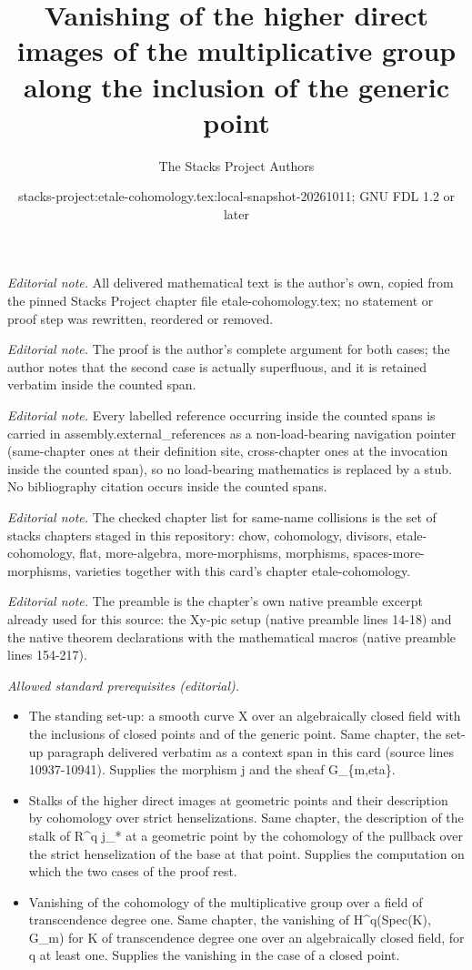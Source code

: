\documentclass[10pt,a4paper]{amsart}
\title{Vanishing of the higher direct images of the multiplicative group along the inclusion of the generic point}
\author{The Stacks Project Authors}
\date{stacks-project:etale-cohomology.tex:local-snapshot-20261011; GNU FDL 1.2 or later}
\theoremstyle{plain}
\theoremstyle{definition}
\theoremstyle{remark}
\numberwithin{equation}{subsection}
\begin{document}
\maketitle
\noindent\textit{Editorial note.} All delivered mathematical text is the author's own, copied from the pinned Stacks Project chapter file etale-cohomology.tex; no statement or proof step was rewritten, reordered or removed.\par\medskip
\noindent\textit{Editorial note.} The proof is the author's complete argument for both cases; the author notes that the second case is actually superfluous, and it is retained verbatim inside the counted span.\par\medskip
\noindent\textit{Editorial note.} Every labelled reference occurring inside the counted spans is carried in assembly.external\_references as a non-load-bearing navigation pointer (same-chapter ones at their definition site, cross-chapter ones at the invocation inside the counted span), so no load-bearing mathematics is replaced by a stub. No bibliography citation occurs inside the counted spans.\par\medskip
\noindent\textit{Editorial note.} The checked chapter list for same-name collisions is the set of stacks chapters staged in this repository: chow, cohomology, divisors, etale-cohomology, flat, more-algebra, more-morphisms, morphisms, spaces-more-morphisms, varieties together with this card's chapter etale-cohomology.\par\medskip
\noindent\textit{Editorial note.} The preamble is the chapter's own native preamble excerpt already used for this source: the Xy-pic setup (native preamble lines 14-18) and the native theorem declarations with the mathematical macros (native preamble lines 154-217).\par\medskip
\noindent\textit{Allowed standard prerequisites (editorial).}\begin{itemize}
\item The standing set-up: a smooth curve X over an algebraically closed field with the inclusions of closed points and of the generic point. Same chapter, the set-up paragraph delivered verbatim as a context span in this card (source lines 10937-10941). Supplies the morphism j and the sheaf G\_\{m,eta\}.
\item Stalks of the higher direct images at geometric points and their description by cohomology over strict henselizations. Same chapter, the description of the stalk of R\textasciicircum{}q j\_* at a geometric point by the cohomology of the pullback over the strict henselization of the base at that point. Supplies the computation on which the two cases of the proof rest.
\item Vanishing of the cohomology of the multiplicative group over a field of transcendence degree one. Same chapter, the vanishing of H\textasciicircum{}q(Spec(K), G\_m) for K of transcendence degree one over an algebraically closed field, for q at least one. Supplies the vanishing in the case of a closed point.
\end{itemize}\medskip
\end{document}
